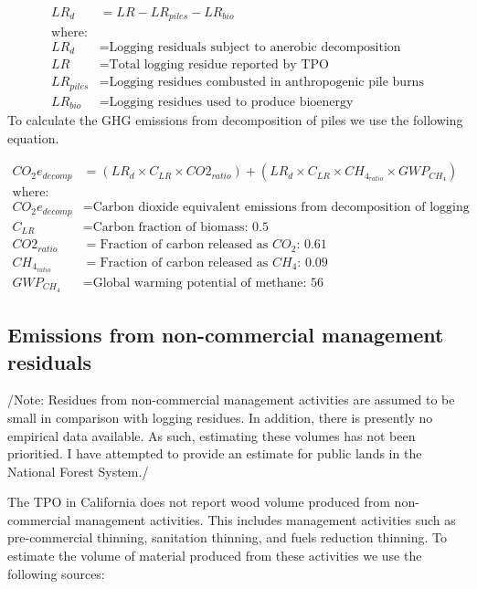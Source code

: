 \documentclass[a4paper]{article}
\begin{document}
\begin{enumerate}
\begin{align*}
LR_d &= LR - LR_{piles} - LR_{bio} \\
\text{where:}\\
LR_d &= \text{Logging residuals subject to anerobic decomposition} \\
LR &= \text{Total logging residue reported by TPO}\\
LR_{piles} &= \text{Logging residues combusted in anthropogenic pile burns}\\
LR_{bio} &= \text{Logging residues used to produce bioenergy}
\end{align*}
To calculate the GHG emissions from decomposition of piles we use the
following equation.

\begin{align*}
CO_2e_{decomp} &= \left(LR_d \times C_{LR} \times CO2_{ratio} \right) + \left(LR_d \times C_{LR} \times CH_4_{ratio}\times GWP_{CH_4}\right)\\
\text{where:}\\
CO_2e_{decomp} &= \text{Carbon dioxide equivalent emissions from decomposition of logging slash}\\
C_{LR} &= \text{Carbon fraction of biomass: 0.5}\\
CO2_{ratio} &= \text{Fraction of carbon released as } CO_2\text{: 0.61}\\
CH_4_{ratio} &= \text{Fraction of carbon released as } CH_4\text{: 0.09}\\
GWP_{CH_4} &= \text{Global warming potential of methane: 56}
\end{align*}
\end{enumerate}

\subsection{Emissions from non-commercial management residuals}
\label{sec-3-5}

/Note: Residues from non-commercial management activities are assumed to
be small in comparison with logging residues. In addition, there is
presently no empirical data available. As such, estimating these volumes
has not been prioritied. I have attempted to provide an estimate for
public lands in the National Forest System./

The TPO in California does not report wood volume produced from
non-commercial management activities. This includes management
activities such as pre-commercial thinning, sanitation thinning, and
fuels reduction thinning. To estimate the volume of material produced
from these activities we use the following sources:
\end{document}
